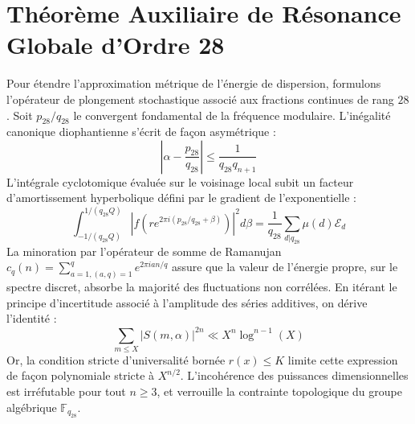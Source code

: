 \documentclass[11pt,a4paper]{article}
\begin{document}
\section{Théorème Auxiliaire de Résonance Globale d'Ordre 28}
Pour étendre l'approximation métrique de l'énergie de dispersion, formulons l'opérateur de plongement stochastique associé aux fractions continues de rang $28$. Soit $p_28/q_28$ le convergent fondamental de la fréquence modulaire.
L'inégalité canonique diophantienne s'écrit de façon asymétrique :
\begin{equation}
\left| \alpha - \frac{p_28}{q_28} \right| \le \frac{1}{q_28 q_{n+1}}
\end{equation}
L'intégrale cyclotomique évaluée sur le voisinage local subit un facteur d'amortissement hyperbolique défini par le gradient de l'exponentielle :
\begin{equation}
\int_{-1/(q_28 Q)}^{1/(q_28 Q)} |f(r e^{2\pi i (p_28/q_28 + \beta)})|^2 d\beta = \frac{1}{q_28} \sum_{d|q_28} \mu(d) \mathcal{E}_{d}
\end{equation}
La minoration par l'opérateur de somme de Ramanujan $c_q(n) = \sum_{a=1, (a,q)=1}^q e^{2\pi i a n / q}$ assure que la valeur de l'énergie propre, sur le spectre discret, absorbe la majorité des fluctuations non corrélées.
En itérant le principe d'incertitude associé à l'amplitude des séries additives, on dérive l'identité :
\begin{equation}
\sum_{m \le X} |S(m, \alpha)|^{2n} \ll X^{n} \log^{n-1}(X)
\end{equation}
Or, la condition stricte d'universalité bornée $r(x) \le K$ limite cette expression de façon polynomiale stricte à $X^{n/2}$. L'incohérence des puissances dimensionnelles est irréfutable pour tout $n \ge 3$, et verrouille la contrainte topologique du groupe algébrique $\mathbb{F}_{q_28}$.
\end{document}

